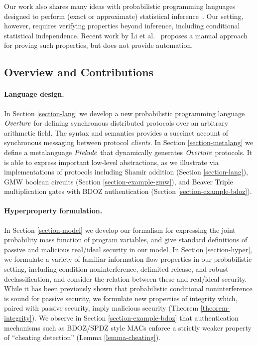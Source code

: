 Our work also shares many ideas with probabilistic programming
languages designed to perform (exact or approximate) statistical
inference~\cite{holtzen2020scaling, carpenter2017stan, wood2014new,
  bingham2019pyro, albarghouthi2017fairsquare, de2007problog,
  pfeffer2009figaro, saad2021sppl}. Our setting, however, requires
verifying properties beyond inference, including conditional
statistical independence. Recent work by Li et al.~\cite{li2023lilac} proposes a
manual approach for proving such properties, but does not provide
automation.

\subsection{Overview and Contributions}

\paragraph{Language design.} In Section \ref{section-lang} we
develop a new probabilistic programming language $\mathit{Overture}$ for
defining synchronous distributed protocols over an arbitrary
arithmetic field. The syntax and semantics provides a succinct account
of synchronous messaging between protocol \emph{clients}. In Section
\ref{section-metalang} we define a metalanguage $\mathit{Prelude}$ that
dynamically generates $\mathit{Overture}$ protocols. It is able to express
important low-level abstractions, as we illustrate via implementations
of protocols including Shamir addition (Section \ref{section-lang}),
GMW boolean circuits (Section \ref{section-example-gmw}), and Beaver
Triple multiplication gates with BDOZ authentication (Section
\ref{section-example-bdoz}).

\paragraph{Hyperproperty formulation.} In Section \ref{section-model} we
develop our formalism for expressing the joint probability mass function of
program variables, and give standard definitions of passive and
malicious real/ideal security in our model. In Section
\ref{section-hyper}, we formulate a variety of familiar information
flow properties in our probabilistic setting, including condition
noninterference, delimited release, and robust declassification, and
consider the relation between these and real/ideal security.  While it
has been previously shown that probabilistic conditional
noninterference is sound for passive security, we formulate new
properties of integrity which, paired with passive security, imply
malicious security (Theorem \ref{theorem-integrity}). We observe
in Section \ref{section-example-bdoz} that authentication mechanisms
such as BDOZ/SPDZ style MACs enforce a strictly weaker property
of ``cheating detection'' (Lemma \ref{lemma-cheating}). 



